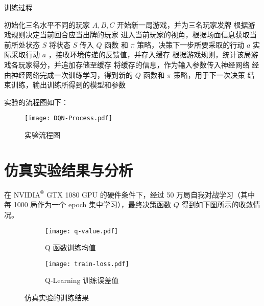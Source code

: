 \begin{algorithm}[H]
    \caption{训练过程}
    \begin{algorithmic}[1] %
        \State 初始化三名水平不同的玩家 $A, B, C$
        \Repeat
        \State 开始新一局游戏，并为三名玩家发牌
        \Repeat
        \State 根据游戏规则决定当前回合应当出牌的玩家
        \State 进入当前玩家的视角，根据场面信息获取当前所处状态 $S$
        \State 将状态 $S$ 传入 $Q$ 函数 和 $\pi$ 策略，决策下一步所要采取的行动 $a$
        \State 实际采取行动 $a$ ，接收环境传递的反馈值，并存入缓存
        \State 根据游戏规则，统计该局游戏各玩家得分，并追加存储至缓存
        \State 将缓存的信息，作为输入参数传入神经网络
        \State 经由神经网络完成一次训练学习，得到新的 $Q$ 函数和 $\pi$ 策略，用于下一次决策
        \State 结束训练，输出训练所得到的模型和参数
    \end{algorithmic}
\end{algorithm}

实验的流程图如下：

\begin{figure}[H]
    \centering
    \texttt{[image: DQN-Process.pdf]}
    \caption{实验流程图}
\end{figure}

\section{仿真实验结果与分析}

在 $\mathrm{NVIDIA}^\circledR$ GTX 1080 GPU 的硬件条件下，经过 50 万局自我对战学习（其中每 1000 局作为一个 epoch 集中学习），最终决策函数 $Q$ 得到如下图所示的收敛情况。

\begin{figure}[H]
	\centering
	\begin{subfigure}{0.45\textwidth} %
		\texttt{[image: q-value.pdf]}
		\caption{Q 函数训练均值}\label{img:q-value} %
	\end{subfigure}
	\vspace{1em} %
	\begin{subfigure}{0.45\textwidth} %
		\texttt{[image: train-loss.pdf]}
		\caption{Q-Learning 训练误差值}\label{img:train-loss} %
	\end{subfigure}
	\caption{仿真实验的训练结果} %
\end{figure}


